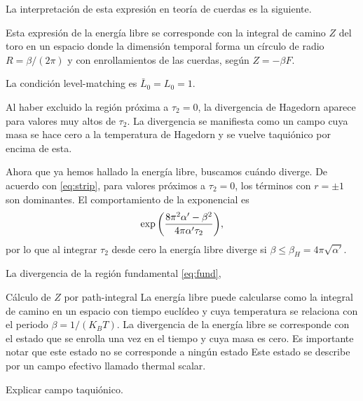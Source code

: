 La interpretación de esta expresión en teoría de cuerdas es la siguiente.

Esta expresión de la energía libre se corresponde con la integral de camino $Z$ del toro en
un espacio donde la dimensión temporal forma un círculo de radio $R=\beta/(2\pi)$ y con enrollamientos
de las cuerdas, según $Z=-\beta F$.

La condición level-matching es $\bar L_0 = L_0 = 1$.

Al haber excluido la región próxima a $\tau_2=0$, la divergencia de Hagedorn aparece para
valores muy altos de $\tau_2$.
La divergencia se manifiesta como un campo cuya masa se hace cero a la temperatura de Hagedorn
y se vuelve taquiónico por encima de esta.


%
%

Ahora que ya hemos hallado la energía libre, buscamos cuándo diverge.
De acuerdo con \ref{eq:strip}, para valores próximos a $\tau_2=0$, los términos con $r=\pm 1$
son dominantes. El comportamiento de la exponencial es
\begin{equation}
  \exp\qty(\frac{8\pi^2 \alpha' -\beta^2}{4\pi\alpha'\tau_2}),
\end{equation}
por lo que al integrar $\tau_2$ desde cero la energía libre diverge si $\beta\leq \beta_H=4\pi\sqrt{\alpha'}$.

La divergencia de  la región fundamental \ref{eq:fund}, 

Cálculo de $Z$ por path-integral
La energía libre puede calcularse como la integral de camino en un espacio con tiempo euclídeo
y cuya temperatura se relaciona con el periodo $\beta=1/(K_BT)$.
La divergencia de la energía libre se corresponde con el estado que se enrolla una vez en el 
tiempo y cuya masa es cero.
Es importante notar que este estado no se corresponde a ningún estado
Este estado se describe por un campo efectivo llamado thermal scalar.

Explicar campo taquiónico.

